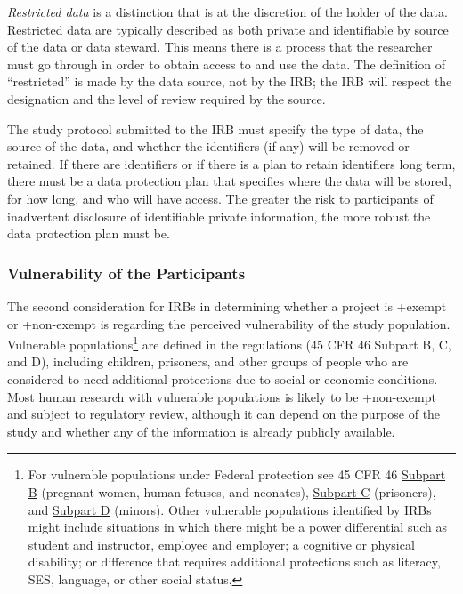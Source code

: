 \documentclass[
]{book}
\begin{document}
\emph{Restricted data} is a distinction that is at the discretion of the holder of the data. Restricted data are typically described as both private and identifiable by source of the data or data steward. This means there is a process that the researcher must go through in order to obtain access to and use the data. The definition of ``restricted'' is made by the data source, not by the IRB; the IRB will respect the designation and the level of review required by the source.

The study protocol submitted to the IRB must specify the type of data, the source of the data, and whether the identifiers (if any) will be removed or retained. If there are identifiers or if there is a plan to retain identifiers long term, there must be a data protection plan that specifies where the data will be stored, for how long, and who will have access. The greater the risk to participants of inadvertent disclosure of identifiable private information, the more robust the data protection plan must be.

\hypertarget{vulnerability-of-the-participants}{%
\subsubsection{Vulnerability of the Participants}\label{vulnerability-of-the-participants}}

The second consideration for IRBs in determining whether a project is +exempt\textbar{} or +non-exempt\textbar{} is regarding the perceived vulnerability of the study population. Vulnerable populations\footnote{For vulnerable populations under Federal protection see 45 CFR 46 \href{https://www.law.cornell.edu/cfr/text/45/part-46/subpart-B}{Subpart B} (pregnant women, human fetuses, and neonates), \href{https://www.law.cornell.edu/cfr/text/45/part-46/subpart-C}{Subpart C} (prisoners), and \href{https://www.law.cornell.edu/cfr/text/45/part-46/subpart-D}{Subpart D} (minors). Other vulnerable populations identified by IRBs might include situations in which there might be a power differential such as student and instructor, employee and employer; a cognitive or physical disability; or difference that requires additional protections such as literacy, SES, language, or other social status.} are defined in the regulations (45 CFR 46 Subpart B, C, and D), including children, prisoners, and other groups of people who are considered to need additional protections due to social or economic conditions. Most human research with vulnerable populations is likely to be +non-exempt\textbar{} and subject to regulatory review, although it can depend on the purpose of the study and whether any of the information is already publicly available.
\end{document}

